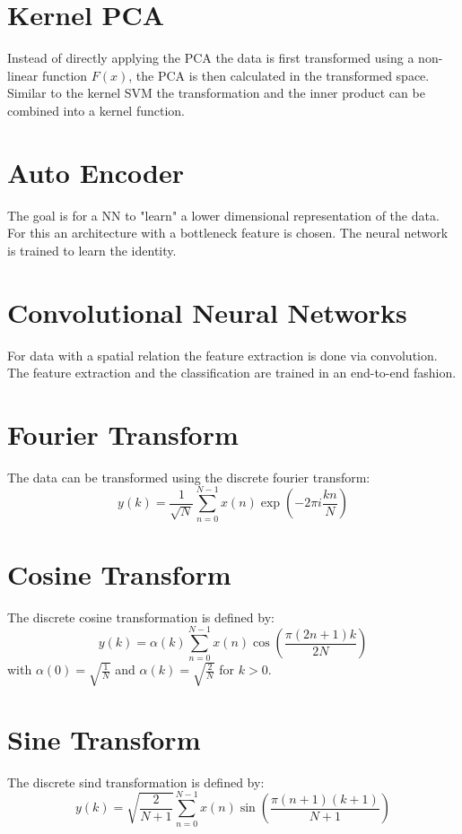 \section{Kernel PCA}
Instead of directly applying the PCA the data is first transformed using a non-linear function $F(x)$, the PCA is then calculated in the transformed space. Similar to the kernel SVM the transformation and the inner product can be combined into a kernel function.

\section{Auto Encoder}
The goal is for a NN to "learn" a lower dimensional representation of the data. For this an architecture with a bottleneck feature is chosen. The neural network is trained to learn the identity.

\section{Convolutional Neural Networks}
For data with a spatial relation the feature extraction is done via convolution. The feature extraction and the classification are trained in an end-to-end fashion.

\section{Fourier Transform}
The data can be transformed using the discrete fourier transform:
\begin{equation*}
    y(k) = \frac{1}{\sqrt{N}} \sum_{n=0}^{N-1} x(n) \exp\left( -2 \pi i \frac{kn}{N} \right)
\end{equation*}

\section{Cosine Transform}
The discrete cosine transformation is defined by:
\begin{equation*}
    y(k) = \alpha(k) \sum_{n=0}^{N-1} x(n) \cos \left(\frac{\pi (2n + 1)k}{2 N} \right)
\end{equation*}
with $\alpha(0) = \sqrt{\frac{1}{N}}$ and $\alpha(k) = \sqrt{\frac{2}{N}}$ for $k > 0$.

\section{Sine Transform}
The discrete sind transformation is defined by:
\begin{equation*}
    y(k) = \sqrt{\frac{2}{N+1}} \sum_{n=0}^{N-1} x(n) \sin\left(\frac{\pi (n+1)(k+1)}{N
+1}\right)
\end{equation*}

